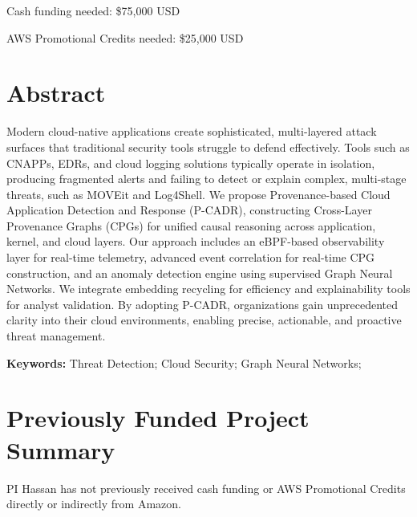 \documentclass[11pt,pdftex]{article}
\begin{document}
\thispagestyle{firststyle}
\vspace{-3mm}

Cash funding needed: \$75,000 USD

AWS Promotional Credits needed: \$25,000 USD

  \section*{Abstract}
  Modern cloud-native applications create sophisticated, multi-layered attack surfaces that traditional security tools struggle to defend effectively. Tools such as CNAPPs, EDRs, and cloud logging solutions typically operate in isolation, producing fragmented alerts and failing to detect or explain complex, multi-stage threats, such as MOVEit and Log4Shell. We propose Provenance-based Cloud Application Detection and Response (P-CADR), constructing Cross-Layer Provenance Graphs (CPGs) for unified causal reasoning across application, kernel, and cloud layers. Our approach includes an eBPF-based observability layer for real-time telemetry, advanced event correlation for real-time CPG construction, and an anomaly detection engine using supervised Graph Neural Networks. We integrate embedding recycling for efficiency and explainability tools for analyst validation. By adopting P-CADR, organizations gain unprecedented clarity into their cloud environments, enabling precise, actionable, and proactive threat management.



\smallskip
{\bf Keywords:} Threat Detection; Cloud Security; Graph Neural Networks;


\thispagestyle{firststyle}
\setcounter{page}{1}


\pagestyle{plain}
\newpage

\setcounter{page}{1}
{\scriptsize
\printbibliography
}

\newpage


\setcounter{page}{1}
\newpage
\section*{Previously Funded Project Summary}
PI Hassan has not previously received cash funding or AWS Promotional Credits directly or indirectly from Amazon.
\end{document}
